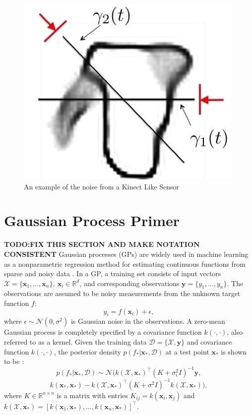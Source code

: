 \documentclass[letterpaper, 10 pt, conference]{ieeeconf}  %
\newcommand{\by}{\mathbf{y}}
\newcommand{\bx}{\mathbf{x}}
\newcommand{\mX}{\mathcal{X}}
\newcommand{\mD}{\mathcal{D}}
\newcommand{\mN}{\mathcal{N}}
\begin{document}
\begin{figure}[ht!]
\centering
\includegraphics[scale = 0.3]{figures/Slide2.jpg}
\caption{An example of the noise from a Kinect Like Sensor}
\vspace*{-10pt}
\label{fig:noisy data}
\end{figure}


\section{Gaussian Process Primer}
\textbf{TODO:FIX THIS SECTION AND MAKE NOTATION CONSISTENT}
 Gaussian processes (GPs) are widely used in machine learning as a nonparametric regression method for estimating continuous functions from sparse and noisy data \cite{rasmussen2006}.
In a GP, a training set consists of input vectors $\mX = \{\bx_1, \ldots, \bx_n\}, ~\bx_i \in \mathbb{R}^d$, and corresponding observations $\by = \{y_1, \ldots, y_n\}$.
The observations are assumed to be noisy measurements from the unknown target function $f$:
\begin{equation}
y_i = f(\bx_i) + \epsilon,
\end{equation}
where $\epsilon \sim \mN(0,\sigma^2)$ is Gaussian noise in the observations.
A zero-mean Gaussian process is completely specified by a covariance function $k(\cdot,\cdot)$, also referred to as a kernel.
Given the training data $\mD = \{\mX, \by\}$ and covariance function $k(\cdot,\cdot)$, the posterior density $p(f_*|\bx_*,\mD)$ at a test point $\bx_{*}$ is shown to be \cite{rasmussen2006}:
\begin{equation}
  p(f_*|\bx_*,\mD) 
  \sim 
  \mN\big(k(\mX,\bx_*)^{\intercal}(K + \sigma_{\epsilon}^2I)^{-1}\by,
\end{equation}
\[
  k(\bx_*,\bx_*)-k(\mX,\bx_*)^{\intercal}(K+\sigma^2I)^{-1}k(\mX,\bx_*)\big), \label{eq:GPposterior}
\]
where $K \in \mathbb{R}^{n \times n}$ is a matrix with entries $K_{ij} = k(\bx_i,\bx_j)$ and $k(\mX,\bx_*) = [k(\bx_1,\bx_*),\ldots,k(\bx_n,\bx_*)]^{\intercal}$. 
\end{document}
